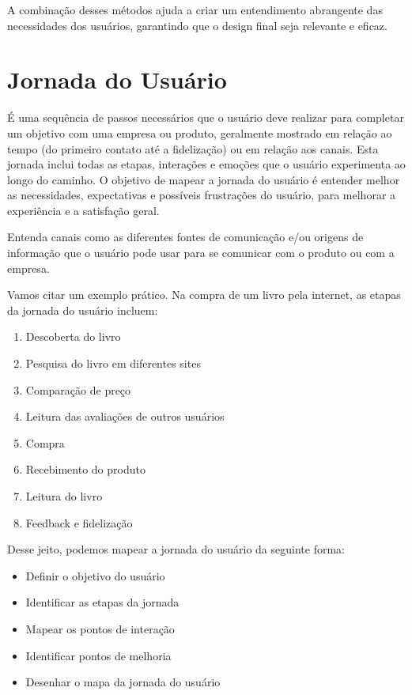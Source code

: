 \documentclass[
  12pt,
  openright,
  twoside,
  a4paper,
  english,
  french,
  spanish,
  brazil
]{abntex2}
\begin{document}
A combinação desses métodos ajuda a criar um entendimento abrangente das
necessidades dos usuários, garantindo que o design final seja relevante e
eficaz.

\section{Jornada do Usuário} \label{user-journey}

É uma sequência de passos necessários que o usuário deve realizar para completar
um objetivo com uma empresa ou produto, geralmente mostrado em relação ao tempo
(do primeiro contato até a fidelização) ou em relação aos canais. Esta jornada
inclui todas as etapas, interações e emoções que o usuário experimenta ao longo
do caminho. O objetivo de mapear a jornada do usuário é entender melhor as
necessidades, expectativas e possíveis frustrações do usuário, para melhorar a
experiência e a satisfação geral.

Entenda canais como as diferentes fontes de comunicação e/ou origens de
informação que o usuário pode usar para se comunicar com o produto ou com a
empresa.

Vamos citar um exemplo prático. Na compra de um livro pela internet, as etapas
da jornada do usuário incluem:

\begin{enumerate}
  \item Descoberta do livro
  \item Pesquisa do livro em diferentes sites
  \item Comparação de preço
  \item Leitura das avaliações de outros usuários
  \item Compra
  \item Recebimento do produto
  \item Leitura do livro
  \item Feedback e fidelização
\end{enumerate}

Desse jeito, podemos mapear a jornada do usuário da seguinte forma:

\begin{itemize}
  \item Definir o objetivo do usuário
  \item Identificar as etapas da jornada
  \item Mapear os pontos de interação
  \item Identificar pontos de melhoria
  \item Desenhar o mapa da jornada do usuário
\end{itemize}
\end{document}
